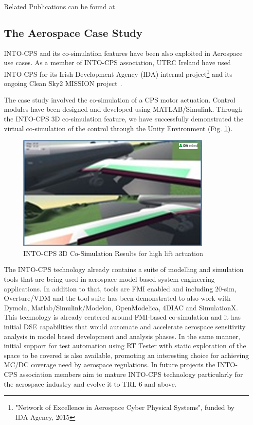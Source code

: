 Related Publications can be found at~\cite{Larsen&16d}

\subsection{The Aerospace Case Study}
INTO-CPS and its co-simulation features have been also exploited in Aerospace use cases. As a member of INTO-CPS association, UTRC Ireland have used INTO-CPS for its Irish Development Agency (IDA) internal project\footnote{"Network of Excellence in Aerospace Cyber Physical Systems", funded by IDA Agency, 2015} and its ongoing Clean Sky2 MISSION project~\cite{Burgio&17}.

The case study involved the co-simulation of a CPS motor actuation. Control modules have been designed and developed using MATLAB/Simulink. Through the INTO-CPS 3D co-simulation feature, we have successfully demonstrated the virtual co-simulation of the control through the Unity Environment (Fig. \ref{fig:aero}).

\begin{figure}[!ht]
	\centering
		\includegraphics[width=0.9 \textwidth]{./figures/aero}
	\caption{INTO-CPS 3D Co-Simulation Results for high lift actuation}
	\label{fig:aero}
\end{figure}

The INTO-CPS technology already contains a suite of modelling and simulation tools that are being used in aerospace model-based system engineering applications. In addition to that, tools are FMI enabled and including 20-sim, Overture/VDM and the tool suite has been demonstrated to also work with Dymola, Matlab/Simulink/Modelon, OpenModelica, 4DIAC and SimulationX. This technology is already centered around FMI-based co-simulation and it has initial DSE capabilities that would automate and accelerate aerospace sensitivity analysis in model based development and analysis phases. In the same manner, initial support for test automation using RT Tester with static exploration of the space to be covered is also available, promoting an interesting choice for achieving MC/DC coverage need by aerospace regulations. In future projects the INTO-CPS association members aim to mature INTO-CPS  technology particularly for the aerospace industry and evolve it to TRL 6 and above.

